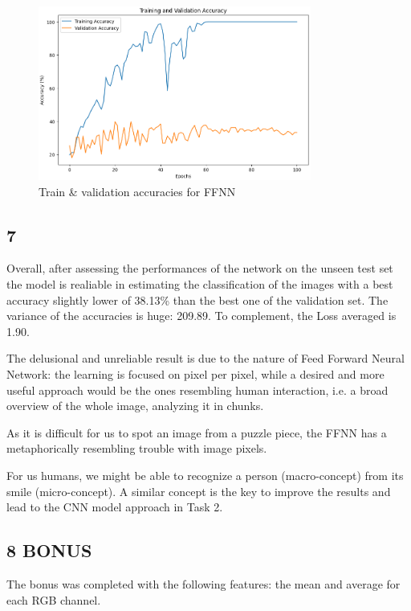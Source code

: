 \documentclass[11pt]{scrartcl}
\begin{document}
\begin{figure}[htbp]
\centering
\includegraphics[width=0.8\textwidth]{./figures/task1-accuracy.png}
\caption{Train \& validation accuracies for FFNN}
\label{fig:task1-accuracy}
\end{figure}

\subsection*{7}

Overall, after assessing the performances of the network on the unseen test set
the model is realiable in estimating the classification of the images with
a best accuracy slightly lower of 38.13\% than the best one of the validation set.
The variance of the accuracies is huge: 209.89.
To complement, the Loss averaged is 1.90. 

The delusional and unreliable result is due to the nature of Feed Forward Neural Network:
the learning is focused on pixel per pixel,
while a desired and more useful approach would be the ones resembling human interaction,
i.e. a broad overview of the whole image,
analyzing it in chunks.

As it is difficult for us to spot an image from a puzzle piece,
the FFNN has a metaphorically resembling trouble with image pixels.

For us humans, we might be able to recognize a person (macro-concept) 
from its smile (micro-concept).
A similar concept is the key to improve the results 
and lead to the CNN model approach in Task 2.


\subsection*{8 BONUS}

The bonus was completed with the following features:
the mean and average for each RGB channel.
\end{document}
